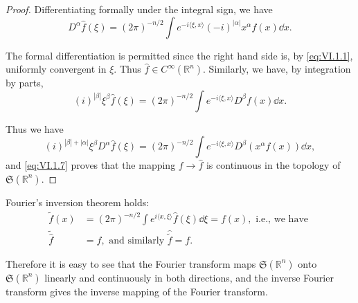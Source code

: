 \begin{proof}
 Differentiating formally under the integral sign, we have 
\begin{equation}\label{eq:VI.1.5}
D ^{\alpha} \hat {f} (\xi) = (2 \pi) ^{-n/2} \int e ^{- i \langle \xi , x \rangle} (- i) ^{| \alpha |} x ^{\alpha} f (x) \dd x. \end{equation}

The formal differentiation is permitted since the right hand side is, by \eqref{eq:VI.1.1}, uniformly convergent in $\xi$. Thus $\hat{f} \in C^{\infty}(\mathbb{R}^{n})$. Similarly, we have, by integration by parts, 
\begin{equation}\label{eq:VI.1.6}
(i) ^{| \beta |} \xi^{\beta} \hat {f} (\xi) = (2 \pi) ^{-n/2} \int e ^{- i \langle \xi , x \rangle} D ^{\beta} f (x) \dd x.
\end{equation}

Thus we have 
\begin{equation}\label{eq:VI.1.7}
(i) ^{| \beta | + | \alpha |} \xi^{\beta} D ^{\alpha} \hat {f} (\xi) = (2 \pi) ^{-n/2} \int e ^{- i \langle \xi , x \rangle} D ^{\beta} (x ^{\alpha} f (x)) \dd x,
\end{equation}
and \eqref{eq:VI.1.7} proves that the mapping $f \to \hat{f}$ is continuous in the topology of $\mathfrak{S}(\mathbb{R}^{n})$. 
\end{proof}

\begin{theorem}\label{thm:VI.1.Theorem.1} Fourier's inversion theorem holds: 
\begin{align}
\tilde {f} (x)& = (2 \pi) ^{-n/2} \int e ^{i \langle x, \xi \rangle} \hat {f} (\xi) \dd \xi = f (x), \text{ i.e., we have } \label{eq:VI.1.8} \\
\tilde {\hat {f}}& = f, \text{ and similarly } \hat {\tilde {f}} = f. \tag{8'}\label{eq:VI.1.8'}
\end{align}
\end{theorem}

Therefore it is easy to see that the Fourier transform maps $\mathfrak{S}(\mathbb{R}^{n})$ onto $\mathfrak{S}(\mathbb{R}^{n})$ linearly and continuously in both directions, and the inverse Fourier transform gives the inverse mapping of the Fourier transform. 

